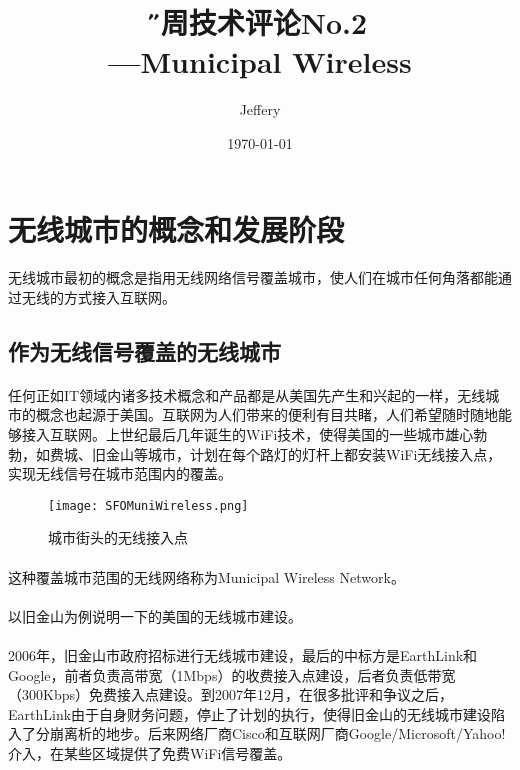 \documentclass[a4paper,14pt,openany]{article}
\title{\H 每周技术评论No.2\\ ---Municipal Wireless}
\author{Jeffery}
\date{\E\today}
\begin{document}
\maketitle %

\newpage %
\tableofcontents %

\newpage
\section{无线城市的概念和发展阶段} %
\paragraph{}
无线城市最初的概念是指用无线网络信号覆盖城市，使人们在城市任何角落都能通过无线的方式接入互联网。
\subsection{作为无线信号覆盖的无线城市}
\paragraph{}
任何正如IT领域内诸多技术概念和产品都是从美国先产生和兴起的一样，无线城市的概念也起源于美国。互联网为人们带来的便利有目共睹，人们希望随时随地能够接入互联网。上世纪最后几年诞生的WiFi技术，使得美国的一些城市雄心勃勃，如费城、旧金山等城市，计划在每个路灯的灯杆上都安装WiFi无线接入点，实现无线信号在城市范围内的覆盖。
\begin{figure}[htbp]
\small
\centering
\texttt{[image: SFOMuniWireless.png]}
\caption{城市街头的无线接入点}
\label{fig:Municipal Wireless}
\end{figure}

\paragraph{}
这种覆盖城市范围的无线网络称为Municipal Wireless Network。
\paragraph{}
以旧金山为例说明一下的美国的无线城市建设。
\paragraph{}
2006年，旧金山市政府招标进行无线城市建设，最后的中标方是EarthLink和Google，前者负责高带宽（1Mbps）的收费接入点建设，后者负责低带宽（300Kbps）免费接入点建设。到2007年12月，在很多批评和争议之后，EarthLink由于自身财务问题，停止了计划的执行，使得旧金山的无线城市建设陷入了分崩离析的地步。后来网络厂商Cisco和互联网厂商Google/Microsoft/Yahoo!介入，在某些区域提供了免费WiFi信号覆盖。
\end{document}
